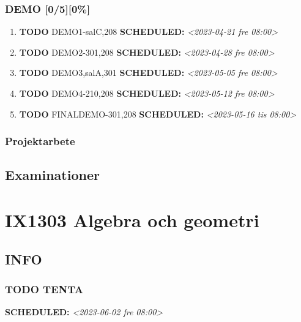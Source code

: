 \documentclass[11pt]{article}
\begin{document}
\subsubsection{DEMO [0/5][0\%]}
\label{sec:org66ec0b6}
\begin{enumerate}
\item {\bfseries\sffamily TODO} DEMO1-salC,208
\label{sec:org1140ed6}
\noindent\textbf{SCHEDULED:} \textit{<2023-04-21 fre 08:00>}\\[0pt]
\item {\bfseries\sffamily TODO} DEMO2-301,208
\label{sec:org5a3a1c4}
\noindent\textbf{SCHEDULED:} \textit{<2023-04-28 fre 08:00>}\\[0pt]
\item {\bfseries\sffamily TODO} DEMO3,salA,301
\label{sec:orga66c1ab}
\noindent\textbf{SCHEDULED:} \textit{<2023-05-05 fre 08:00>}\\[0pt]
\item {\bfseries\sffamily TODO} DEMO4-210,208
\label{sec:org5fa896d}
\noindent\textbf{SCHEDULED:} \textit{<2023-05-12 fre 08:00>}\\[0pt]
\item {\bfseries\sffamily TODO} FINALDEMO-301,208
\label{sec:org29d3b40}
\noindent\textbf{SCHEDULED:} \textit{<2023-05-16 tis 08:00>}\\[0pt]
\end{enumerate}

\subsubsection{Projektarbete}
\label{sec:org76e7889}

\subsection{Examinationer}
\label{sec:orgf322511}

\section{IX1303 Algebra och geometri}
\label{sec:orgf85b7d6}

\subsection{INFO}
\label{sec:org80ddfd2}

\subsubsection{{\bfseries\sffamily TODO} TENTA}
\label{sec:orgfee63d1}
\noindent\textbf{SCHEDULED:} \textit{<2023-06-02 fre 08:00>}\\[0pt]
\end{document}
